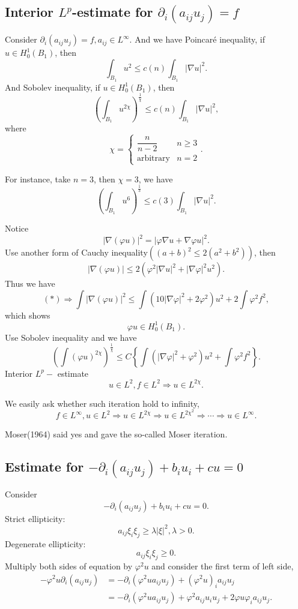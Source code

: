 \documentclass[12pt]{article}
\begin{document}
\subsection{Interior $L^p$-estimate for $\partial_i(a_{ij}u_j) = f$}
Consider $\partial_i(a_{ij}u_j) = f, a_{ij}\in L^\infty$.
And we have Poincar\'{e} inequality, if $u\in H^1_0(B_1)$, then
\[ \int_{B_1} u^2 \le c(n)\int_{B_1} |\nabla u|^2 .\]
And Sobolev inequality, if $u\in H^1_0(B_1)$, then
\[ \left( \int_{B_1}u^{2\chi} \right)^{\frac{1}{\chi}} \le c(n) \int_{B_1} |\nabla u|^2, \]
where
\begin{equation*}
\chi =
\begin{cases}
\dfrac{n}{n - 2}&n \ge 3\\
\mathrm{arbitrary}&n=2
\end{cases}.
\end{equation*}

For instance, take $n=3$, then $\chi = 3$, we have\
\[ \left( \int_{B_1}u^{6} \right)^{\frac{1}{3}} \le c(3) \int_{B_1} |\nabla u|^2. \]

Notice
\[ |\nabla (\varphi u)|^2 = |\varphi \nabla u + \nabla \varphi u|^2 .\]
Use another form of Cauchy inequality$\left((a+b)^2 \le 2\left(a^2+b^2\right)\right)$, then
\[ |\nabla (\varphi u)| \le 2\left(\varphi^2|\nabla u|^2 + |\nabla\varphi|^2u^2\right). \]
Thus we have
\[(*)\Rightarrow \int |\nabla(\varphi u)|^2 \le \int \left( 10|\nabla\varphi|^2 + 2\varphi^2 \right)u^2 + 2\int\varphi^2f^2,\]
which shows
\[\varphi u \in H_0^1(B_1).\]
Use Sobolev inequality and we have
\[ \left( \int (\varphi u)^{2\chi} \right)^{\frac{1}{\chi}} \le C\left\{ \int \left(|\nabla \varphi|^2 + \varphi^2\right)u^2 + \int \varphi^2f^2 \right\}.  \]
Interior $L^p-$ estimate
\[ u\in L^2, f\in L^2 \Rightarrow u\in L^{2\chi}. \]

We easily ask whether such iteration hold to infinity,
\[ f\in L^\infty, u\in L^2 \Rightarrow u \in L^{2\chi} \Rightarrow u \in L^{2\chi^2} \Rightarrow \cdots \Rightarrow u \in L^\infty. \]

Moser(1964) said yes and gave the so-called Moser iteration.

\subsection{Estimate for $-\partial_i(a_{ij}u_j)+b_iu_i +cu = 0$}
Consider
\[-\partial_i(a_{ij}u_j)+b_iu_i+cu = 0.\]
Strict ellipticity:
\[ a_{ij}\xi_i\xi_j \ge \lambda|\xi|^2, \lambda > 0. \]
Degenerate ellipticity:
\[ a_{ij}\xi_i\xi_j \ge 0. \]
Multiply both sides of equation by $\varphi^2 u$ and consider the first term of left side,
\begin{align*}
-\varphi^2u\partial_i(a_{ij}u_j)&=-\partial_i\left(\varphi^2ua_{ij}u_j\right)+\left(\varphi^2u\right)_ia_{ij}u_j\\
&=-\partial_i\left(\varphi^2ua_{ij}u_j\right)+\varphi^2a_{ij}u_iu_j+2\varphi u\varphi_ia_{ij}u_j.
\end{align*}
\end{document}
